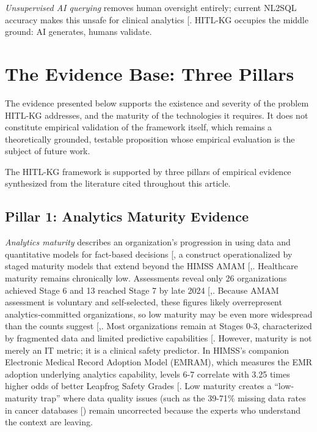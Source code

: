 \documentclass[
  american,
  11pt,
  letterpaper,
  oneside  ,captions=tableheading
]{scrartcl}
\begin{document}
\emph{Unsupervised AI querying} removes human oversight entirely;
current NL2SQL accuracy makes this unsafe for clinical analytics
{[}\citeproc{ref-ziletti2024}{37}{]}. HITL-KG occupies the middle
ground: AI generates, humans validate.

\section{The Evidence Base: Three
Pillars}\label{the-evidence-base-three-pillars}

The evidence presented below supports the existence and severity of the
problem HITL-KG addresses, and the maturity of the technologies it
requires. It does not constitute empirical validation of the framework
itself, which remains a theoretically grounded, testable proposition
whose empirical evaluation is the subject of future work.

The HITL-KG framework is supported by three pillars of empirical
evidence synthesized from the literature cited throughout this article.

\subsection{Pillar 1: Analytics Maturity
Evidence}\label{pillar-1-analytics-maturity-evidence}

\emph{Analytics maturity} describes an organization's progression in
using data and quantitative models for fact-based decisions
{[}\citeproc{ref-davenport2007}{38}{]}, a construct operationalized by
staged maturity models that extend beyond the HIMSS AMAM
{[},\citeproc{ref-langer2025}{40}{]}.
Healthcare maturity remains chronically low. Assessments reveal only 26
organizations achieved Stage 6 and 13 reached Stage 7 by late 2024
{[},\citeproc{ref-himss2024news}{41}{]}.
Because AMAM assessment is voluntary and self-selected, these figures
likely overrepresent analytics-committed organizations, so low maturity
may be even more widespread than the counts suggest
{[},\citeproc{ref-tomaskovic1994}{43}{]}.
Most organizations remain at Stages 0-3, characterized by fragmented
data and limited predictive capabilities
{[}\citeproc{ref-health2020}{44}{]}. However, maturity is not merely an
IT metric; it is a clinical safety predictor. In HIMSS's companion
Electronic Medical Record Adoption Model (EMRAM), which measures the EMR
adoption underlying analytics capability, levels 6-7 correlate with 3.25
times higher odds of better Leapfrog Safety Grades
{[}\citeproc{ref-snowdon2024}{45}{]}. Low maturity creates a
``low-maturity trap'' where data quality issues (such as the 39-71\%
missing data rates in cancer databases
{[}\citeproc{ref-yang2021}{46}{]}) remain uncorrected because the
experts who understand the context are leaving.
\end{document}
